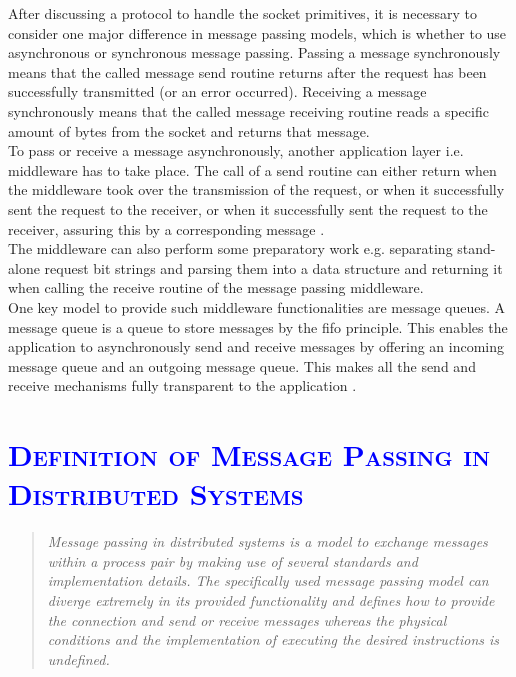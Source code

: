 \documentclass[xcolor=dvipsnames]{article}
\begin{document}
\noindent After discussing a protocol to handle the socket primitives, it is necessary to consider one major difference in message passing models, which is whether to use asynchronous or synchronous message passing. Passing a message synchronously means that the called message send routine returns after the request has been successfully transmitted (or an error occurred). Receiving a message synchronously means that the called message receiving routine reads a specific amount of bytes from the socket and returns that message.\\

\noindent To pass or receive a message asynchronously, another application layer i.e. middleware has to take place. The call of a send routine can either return when the middleware took over the transmission of the request, or when it successfully sent the request to the receiver, or when it successfully sent the request to the receiver, assuring this by a corresponding message \cite[ch. 4.1 on p. 125]{tanenbaum}.\\

\noindent The middleware can also perform some preparatory work e.g. separating stand-alone request bit strings and parsing them into a data structure and returning it when calling the receive routine of the message passing middleware.\\

\noindent One key model to provide such middleware functionalities are message queues. A message queue is a queue to store messages by the \gls{fifo} principle. This enables the application to asynchronously send and receive messages by offering an incoming message queue and an outgoing message queue. This makes all the send and receive mechanisms fully transparent to the application \cite[ch. 4.3.2 on p. 145 - 147]{tanenbaum}.

\section{\scshape{\textcolor{blue}{Definition of Message Passing in Distributed Systems}}}

\begin{quote}
\textit{Message passing in distributed systems is a model to exchange messages within a process pair by making use of several standards and implementation details. The specifically used message passing model can diverge extremely in its provided functionality and defines how to provide the connection and send or receive messages whereas the physical conditions and the implementation of executing the desired instructions is undefined.}
\end{quote}
\end{document}

